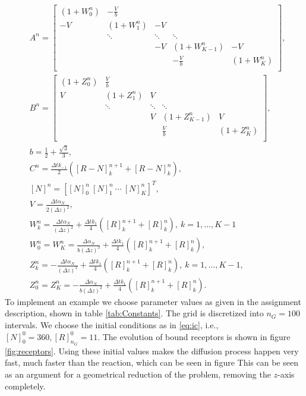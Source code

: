 \documentclass{article}
\begin{document}
\begin{align*}
        &A^n =   
\begin{bmatrix}
        \left( 1 + W_0^n \right) & -\frac{V}{b} &   &  &  \\
        -V & \left(1 + W_1^n \right) & -V  &  &   \\
         & \ddots & \ddots & \ddots &    \\
         &  & -V & \left( 1 + W_{K-1}^n \right) & -V   \\
         &  &  &  -\frac{V}{b} & \left( 1 + W_K^n \right) \\
\end{bmatrix}
,\\
        &B^n = 
\begin{bmatrix}
        \left( 1 + Z_0^n \right) & \frac{V}{b} &   &  &  \\
        V & \left(1 + Z_1^n \right) & V  &  &   \\
         & \ddots & \ddots & \ddots &    \\
         &  & V & \left( 1 + Z_{K-1}^n \right) & V   \\
         &  &  &  \frac{V}{b} & \left( 1 + Z_K^n \right) \\
\end{bmatrix}
,\\
        &b = \frac{1}{2} + \frac{\sqrt{3}}{3}, \\
        &C^n= \frac{\Delta t k_{-1}}{2}([R-N]_k^{n+1} + [R-N]_k^n ) ,\\
        &[N]^n = [[N]_0^n \ [N]_1^n \ \cdots \ [N]_K^n]^T ,\\
        &V = \frac{\Delta t \alpha_N}{2(\Delta z)^2} ,\\
        &W_k^n = \frac{\Delta t \alpha_N}{(\Delta z)^2} + \frac{\Delta t k_1}{4}([R]_{k}^{n+1} + [R]_k^n), \ k = 1, \hdots, K - 1 \\
        &W_0^n = W_K^n = \frac{\Delta \alpha_N}{b(\Delta z)^2} + \frac{\Delta t k_1}{4}([R]_{k}^{n+1} + [R]_k^n),\\
        &Z_k^n = -\frac{\Delta t \alpha_N}{(\Delta z)^2} + \frac{\Delta t k_1}{4}([R]_{k}^{n+1} + [R]_k^n), \ k = 1, \hdots, K- 1, \\
        &Z_0^n = Z_K^n = -\frac{\Delta \alpha_N}{b(\Delta z)^2} + \frac{\Delta t k_1}{4}([R]_{k}^{n+1} + [R]_k^n).
\end{align*}
To implement an example we choose parameter values as given in the assignment description, shown in table \ref{tab:Constants}.
The grid is discretized into $n_G = 100$ intervals.
We choose the initial conditions as in \eqref{eq:ic}, i.e., $[N]_0^0 = 360, [R]_{n_G}^0 = 11$.
The evolution of bound receptors is shown in figure \ref{fig:receptors}.
Using these initial values makes the diffusion process happen very fast, much faster than the reaction, which can be seen in figure 
This can be seen as an argument for a geometrical reduction of the problem, removing the $z$-axis completely.
\end{document}
